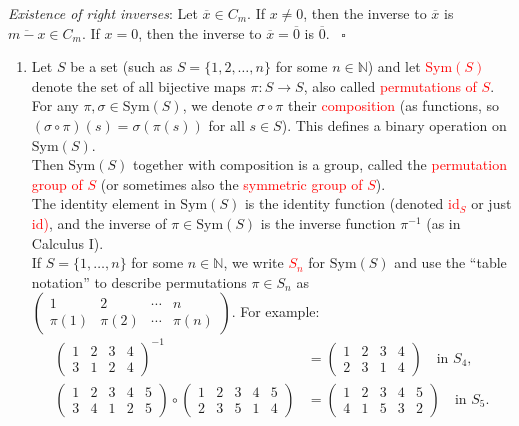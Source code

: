 \documentclass[
  12pt,
  a4paper,
  twoside]{article}
\providecommand{\tightlist}{%
  \setlength{\itemsep}{0pt}\setlength{\parskip}{0pt}}
\theoremstyle{plain}
\theoremstyle{definition}
\begin{document}
\emph{Existence of right inverses}: Let \(\overline{x}\in C_m\). If \(x\neq0\), then the inverse to \(\overline{x}\) is \(\overline{m-x}\in C_m\). If \(x=0\), then the inverse to \(\overline{x}=\overline{0}\) is \(\overline{0}\).
\hfill~{\(\square\)}

\begin{enumerate}
\def\labelenumi{(\alph{enumi})}
\setcounter{enumi}{2}
\tightlist
\item
  Let \(S\) be a set (such as \(S=\{1,2,\dots,n\}\) for some \(n\in\mathbb{N}\)) and let \textcolor{red}{$\mathrm{Sym}(S)$} denote the set of all bijective maps \(\pi : S\to S\), also called \textcolor{red}{permutations of $S$}.\\
  For any \(\pi, \sigma\in \mathrm{Sym}(S)\), we denote \(\sigma\circ\pi\) their \textcolor{red}{composition} (as functions, so \((\sigma\circ\pi)(s) = \sigma(\pi(s))\) for all \(s\in S\)). This defines a binary operation on \(\mathrm{Sym}(S)\).\\
  Then \(\mathrm{Sym}(S)\) together with composition is a group, called the \textcolor{red}{permutation group of $S$} (or sometimes also the \textcolor{red}{symmetric group of $S$}).\\
  The identity element in \(\mathrm{Sym}(S)\) is the identity function (denoted \textcolor{red}{$\mathrm{id}_S$} or just \textcolor{red}{$\mathrm{id}$)}, and the inverse of \(\pi\in\mathrm{Sym}(S)\) is the inverse function \(\pi^{-1}\) (as in Calculus I).\\
  If \(S=\{1,\dots,n\}\) for some \(n\in\mathbb{N}\), we write \textcolor{red}{$S_n$} for \(\mathrm{Sym}(S)\) and use the ``table notation'' to describe permutations \(\pi\in S_n\) as \(\left(\begin{smallmatrix}1&2&\cdots&n\\\pi(1)&\pi(2)&\cdots&\pi(n)\end{smallmatrix}\right)\). For example:
  \begin{align*}
  \begin{pmatrix}1&2&3&4\\3&1&2&4\end{pmatrix}^{-1} &=
  \begin{pmatrix}1&2&3&4\\2&3&1&4\end{pmatrix}\quad\text{in }S_4,\\
  \begin{pmatrix}1&2&3&4&5\\3&4&1&2&5\end{pmatrix}\circ
  \begin{pmatrix}1&2&3&4&5\\2&3&5&1&4\end{pmatrix} &=
  \begin{pmatrix}1&2&3&4&5\\4&1&5&3&2\end{pmatrix}\quad\text{in }S_5.
  \end{align*}
\end{enumerate}
\end{document}
